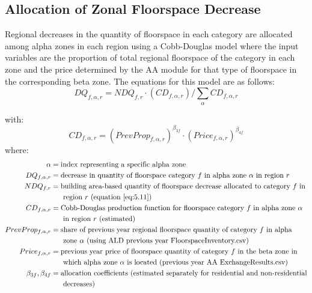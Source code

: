 \subsection{Allocation of Zonal Floorspace Decrease}\label{sec:ald-step3}   %
Regional decreases in the quantity of floorspace in each category are allocated among alpha zones in each region using a Cobb-Douglas model where the input variables are the proportion of total regional floorspace of the category in each zone and the price determined by the AA module for that type of floorspace in the corresponding beta zone. The equations for this model are as follows:
\begin{equation}\label{eq:5.12}  %
DQ_{f,\alpha,r} = NDQ_{f,r} \cdot (CD_{f,\alpha,r}) / \sum_\alpha{CD_{f,\alpha,r}}
\end{equation}

\noindent with:
\begin{equation}   %
CD_{f,\alpha,r} = (PrevProp_{f,\alpha,r})^{\beta_{3f}} \cdot (Price_{f,\alpha,r})^{\beta_{4f}}
\end{equation}
\noindent where:
\begin{align*}
\alpha &= \text{index representing a specific alpha zone} \\
DQ_{f,\alpha,r} &= \text{decrease in quantity of floorspace category $f$ in alpha zone $\alpha$ in region $r$} \\
NDQ_{f,r} &= \text{building area-based quantity of floorspace decrease allocated to category $f$ in} \\
 &~~~~~\text{region $r$ (equation \ref{eq:5.11})} \\
CD_{f,\alpha,r} &= \text{Cobb-Douglas production function for floorspace category $f$ in alpha zone $\alpha$} \\
 &~~~~~\text{in region $r$ (estimated)} \\
PrevProp_{f,\alpha,r} &= \text{share of previous year regional floorspace quantity of category $f$ in alpha} \\
 &~~~~~\text{zone $\alpha$ (using ALD previous year FloorspaceInventory.csv)} \\
Price_{f,\alpha,r} &= \text{previous year price of floorspace quantity of category $f$ in the beta zone in} \\
 &~~~~~\text{which alpha zone $\alpha$ is located (previous year AA ExchangeResults.csv)} \\
\beta_{3f}, \beta_{4f} &= \text{allocation coefficients (estimated separately for residential and non-residential} \\
 &~~~~~\text{decreases)}
\end{align*}

